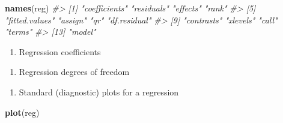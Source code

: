 \documentclass[]{book}
\newenvironment{Shaded}{\begin{snugshade}}{\end{snugshade}}
\newcommand{\CommentTok}[1]{\textcolor[rgb]{0.56,0.35,0.01}{\textit{#1}}}
\newcommand{\KeywordTok}[1]{\textcolor[rgb]{0.13,0.29,0.53}{\textbf{#1}}}
\newcommand{\NormalTok}[1]{#1}
\newcommand{\OperatorTok}[1]{\textcolor[rgb]{0.81,0.36,0.00}{\textbf{#1}}}
\providecommand{\tightlist}{%
  \setlength{\itemsep}{0pt}\setlength{\parskip}{0pt}}
\begin{document}
\begin{Shaded}
\begin{Highlighting}[]
\KeywordTok{names}\NormalTok{(reg)}
\CommentTok{#>  [1] "coefficients"  "residuals"     "effects"       "rank"         }
\CommentTok{#>  [5] "fitted.values" "assign"        "qr"            "df.residual"  }
\CommentTok{#>  [9] "contrasts"     "xlevels"       "call"          "terms"        }
\CommentTok{#> [13] "model"}
\end{Highlighting}
\end{Shaded}

\begin{enumerate}
\def\labelenumi{\arabic{enumi}.}
\setcounter{enumi}{1}
\tightlist
\item
  Regression coefficients
\end{enumerate}

\begin{Shaded}
\end{Shaded}

\begin{enumerate}
\def\labelenumi{\arabic{enumi}.}
\setcounter{enumi}{2}
\tightlist
\item
  Regression degrees of freedom
\end{enumerate}

\begin{Shaded}
\end{Shaded}

\begin{enumerate}
\def\labelenumi{\arabic{enumi}.}
\setcounter{enumi}{3}
\tightlist
\item
  Standard (diagnostic) plots for a regression
\end{enumerate}

\begin{Shaded}
\begin{Highlighting}[]
\KeywordTok{plot}\NormalTok{(reg)}
\end{Highlighting}
\end{Shaded}
\end{document}
